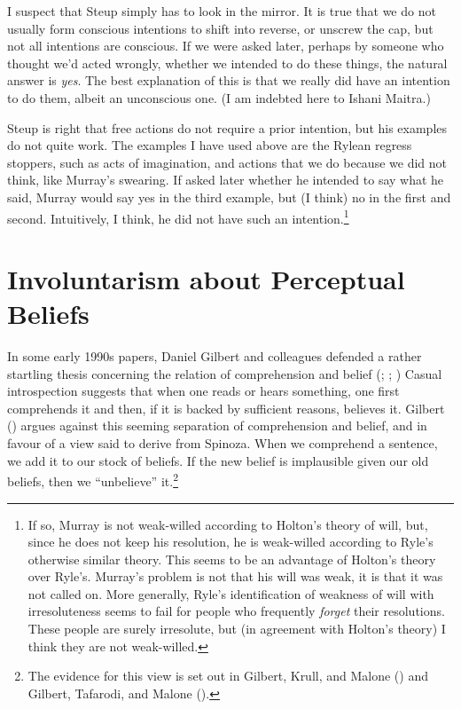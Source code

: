 \documentclass[
  10pt,
  letterpaper,
  DIV=11,
  numbers=noendperiod,
  twoside]{scrartcl}
\begin{document}
I suspect that Steup simply has to look in the mirror. It is true that
we do not usually form conscious intentions to shift into reverse, or
unscrew the cap, but not all intentions are conscious. If we were asked
later, perhaps by someone who thought we'd acted wrongly, whether we
intended to do these things, the natural answer is \emph{yes}. The best
explanation of this is that we really did have an intention to do them,
albeit an unconscious one. (I am indebted here to Ishani Maitra.)

Steup is right that free actions do not require a prior intention, but
his examples do not quite work. The examples I have used above are the
Rylean regress stoppers, such as acts of imagination, and actions that
we do because we did not think, like Murray's swearing. If asked later
whether he intended to say what he said, Murray would say yes in the
third example, but (I think) no in the first and second. Intuitively, I
think, he did not have such an intention.\footnote{If so, Murray is not
  weak-willed according to Holton's theory of will, but, since he does
  not keep his resolution, he is weak-willed according to Ryle's
  otherwise similar theory. This seems to be an advantage of Holton's
  theory over Ryle's. Murray's problem is not that his will was weak, it
  is that it was not called on. More generally, Ryle's identification of
  weakness of will with irresoluteness seems to fail for people who
  frequently \emph{forget} their resolutions. These people are surely
  irresolute, but (in agreement with Holton's theory) I think they are
  not weak-willed.}

\section{Involuntarism about Perceptual
Beliefs}\label{involuntarism-about-perceptual-beliefs}

In some early 1990s papers, Daniel Gilbert and colleagues defended a
rather startling thesis concerning the relation of comprehension and
belief (; ;
) Casual introspection suggests that when one reads or hears
something, one first comprehends it and then, if it is backed by
sufficient reasons, believes it. Gilbert
() argues against this seeming
separation of comprehension and belief, and in favour of a view said to
derive from Spinoza. When we comprehend a sentence, we add it to our
stock of beliefs. If the new belief is implausible given our old
beliefs, then we ``unbelieve'' it.\footnote{The evidence for this view
  is set out in Gilbert, Krull, and Malone
  () and Gilbert, Tafarodi,
  and Malone ().}
\end{document}
